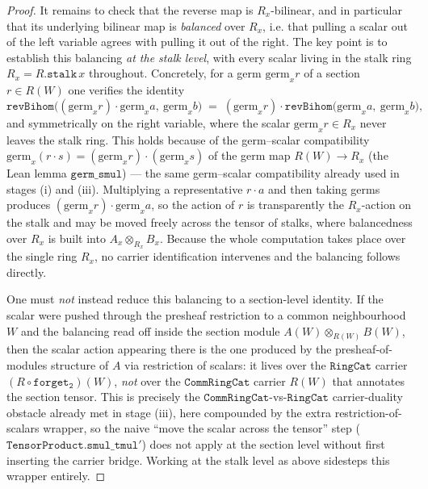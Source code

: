 \begin{proof}
  It remains to check that the reverse map is \(R_x\)-bilinear, and in particular that
  its underlying bilinear map is \emph{balanced} over \(R_x\), i.e. that pulling a scalar
  out of the left variable agrees with pulling it out of the right. The key point is to
  establish this balancing \emph{at the stalk level}, with every scalar living in the
  stalk ring \(R_x = R.\mathtt{stalk}\,x\) throughout. Concretely, for a germ
  \(\mathrm{germ}_x r\) of a section \(r \in R(W)\) one verifies the identity
  \[
    \mathtt{revBihom}\bigl((\mathrm{germ}_x r)\cdot \mathrm{germ}_x a,\ \mathrm{germ}_x b\bigr)
      \;=\; (\mathrm{germ}_x r)\cdot \mathtt{revBihom}\bigl(\mathrm{germ}_x a,\ \mathrm{germ}_x b\bigr),
  \]
  and symmetrically on the right variable, where the scalar \(\mathrm{germ}_x r \in R_x\)
  never leaves the stalk ring. This holds because of the germ--scalar compatibility
  \(\mathrm{germ}_x(r \cdot s) = (\mathrm{germ}_x r)\cdot(\mathrm{germ}_x s)\) of the germ
  map \(R(W) \to R_x\) (the Lean lemma \(\mathtt{germ\_smul}\)) — the same germ--scalar
  compatibility already used in stages (i) and (iii). Multiplying a representative
  \(r \cdot a\) and then taking germs produces \((\mathrm{germ}_x r)\cdot \mathrm{germ}_x a\),
  so the action of \(r\) is transparently the \(R_x\)-action on the stalk and may be
  moved freely across the tensor of stalks, where balancedness over \(R_x\) is built into
  \(A_x \otimes_{R_x} B_x\). Because the whole computation takes place over the single
  ring \(R_x\), no carrier identification intervenes and the balancing follows directly.

  One must \emph{not} instead reduce this balancing to a section-level identity. If the
  scalar were pushed through the presheaf restriction to a common neighbourhood \(W\) and
  the balancing read off inside the section module \(A(W) \otimes_{R(W)} B(W)\), then the
  scalar action appearing there is the one produced by the presheaf-of-modules structure
  of \(A\) via restriction of scalars: it lives over the \(\mathtt{RingCat}\) carrier
  \((R \circ \mathtt{forget_2})(W)\), \emph{not} over the \(\mathtt{CommRingCat}\) carrier
  \(R(W)\) that annotates the section tensor. This is precisely the
  \(\mathtt{CommRingCat}\)-vs-\(\mathtt{RingCat}\) carrier-duality obstacle already met in
  stage (iii), here compounded by the extra restriction-of-scalars wrapper, so the naive
  ``move the scalar across the tensor'' step (\(\mathtt{TensorProduct.smul\_tmul'}\)) does
  not apply at the section level without first inserting the carrier bridge. Working at the
  stalk level as above sidesteps this wrapper entirely.


\end{proof}
